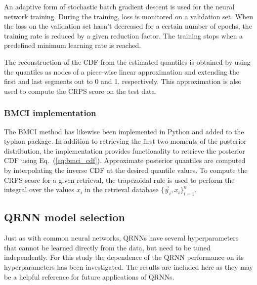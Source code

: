 \documentclass[journal abbreviation, manuscript]{copernicus}
\begin{document}

  An adaptive form of stochastic batch gradient descent is used for the neural
  network training. During the training, loss is monitored on a validation set.
  When the loss on the validation set hasn't decreased for a certain number of
  epochs, the training rate is reduced by a given reduction factor. The training
  stops when a predefined minimum learning rate is reached.

  The reconstruction of the CDF from the estimated quantiles is obtained
  by using the quantiles as nodes of a piece-wise linear approximation and
  extending the first and last segments out to 0 and 1, respectively.
  This approximation is also used to compute the CRPS score on the test
  data.


\subsubsection{BMCI implementation}
\label{sec:implementation_bmci}

 The BMCI method has likewise been implemented in Python and added to the
 typhon package. In addition to retrieving the first two moments of the
 posterior distribution, the implementation provides functionality to
 retrieve the posterior CDF using Eq.~(\ref{eq:bmci_cdf}). Approximate posterior
 quantiles are computed by interpolating the inverse CDF at the desired quantile
 values. To compute the CRPS score for a given retrieval, the trapezoidal rule
 is used to perform the integral over the values $x_i$ in the retrieval database
 $\{\vec{y}_i, x_i\}_{i = 1}^n$.

\subsection{QRNN model selection}

Just as with common neural networks, QRNNs have several hyperparameters that cannot
be learned directly from the data, but need to be tuned independently. For this
study the dependence of the QRNN performance on its hyperparameters has been
investigated. The results are included here as they may be a helpful reference
for future applications of QRNNs.
\end{document}

